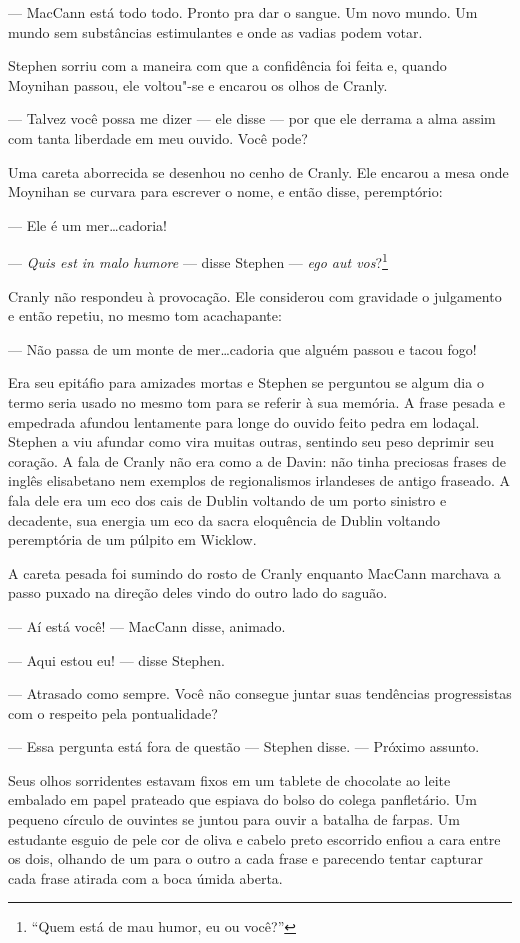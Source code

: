  --- MacCann está todo todo. Pronto pra dar o sangue. Um novo mundo. Um
mundo sem substâncias estimulantes e onde as vadias podem votar.

Stephen sorriu com a maneira com que a confidência foi feita e, quando
Moynihan passou, ele voltou"-se e encarou os olhos de Cranly.

 --- Talvez você possa me dizer --- ele disse --- por que ele derrama a alma
assim com tanta liberdade em meu ouvido. Você pode?

Uma careta aborrecida se desenhou no cenho de Cranly. Ele encarou a mesa
onde Moynihan se curvara para escrever o nome, e então disse,
peremptório:

 --- Ele é um mer\ldots{}cadoria!

 --- \textit{Quis est in malo humore} --- disse Stephen --- \textit{ego aut
vos}?\footnote{ “Quem está de mau humor, eu ou você?”}

Cranly não respondeu à provocação. Ele considerou com gravidade o
julgamento e então repetiu, no mesmo tom acachapante:

 --- Não passa de um monte de mer\ldots{}cadoria que alguém passou e tacou
fogo!

Era seu epitáfio para amizades mortas e Stephen se perguntou se algum
dia o termo seria usado no mesmo tom para se referir à sua memória. A
frase pesada e empedrada afundou lentamente para longe do ouvido feito
pedra em lodaçal. Stephen a viu afundar como vira muitas outras,
sentindo seu peso deprimir seu coração. A fala de Cranly não era como a
de Davin: não tinha preciosas frases de inglês elisabetano nem exemplos
de regionalismos irlandeses de antigo fraseado. A fala dele era um eco
dos cais de Dublin voltando de um porto sinistro e decadente, sua
energia um eco da sacra eloquência de Dublin voltando peremptória de um
púlpito em Wicklow.

A careta pesada foi sumindo do rosto de Cranly enquanto MacCann marchava
a passo puxado na direção deles vindo do outro lado do saguão.

 --- Aí está você! --- MacCann disse, animado.

 --- Aqui estou eu! --- disse Stephen.

 --- Atrasado como sempre. Você não consegue juntar suas tendências
progressistas com o respeito pela pontualidade?

 --- Essa pergunta está fora de questão --- Stephen disse. --- Próximo assunto.

Seus olhos sorridentes estavam fixos em um tablete de chocolate ao leite
embalado em papel prateado que espiava do bolso do colega panfletário.
Um pequeno círculo de ouvintes se juntou para ouvir a batalha de
farpas. Um estudante esguio de pele cor de oliva e cabelo preto
escorrido enfiou a cara entre os dois, olhando de um para o outro a
cada frase e parecendo tentar capturar cada frase atirada com a boca
úmida aberta.

